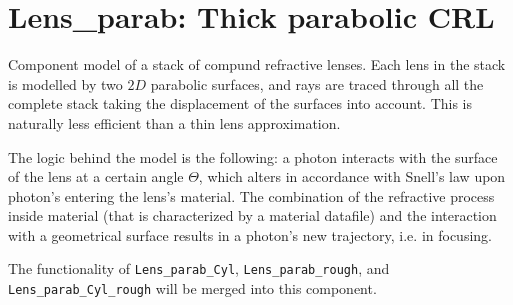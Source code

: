 \section{Lens\_parab: Thick parabolic CRL}
\label{s:lens-parab}

Component model of a stack of compund refractive lenses. Each lens in the stack
is modelled by two $2D$ parabolic surfaces, and rays are traced through all the
complete stack taking the displacement of the surfaces into account. This is
naturally less efficient than a thin lens approximation.

The logic behind the model is the following: a photon interacts with the
surface of the lens at a certain angle $\Theta$, which alters in accordance
with Snell's law upon photon's entering the lens's material. The combination of
the refractive process inside material (that is characterized by a material
datafile) and the interaction with a geometrical surface results in a photon's
new trajectory, i.e. in focusing.

The functionality of \texttt{Lens\_parab\_Cyl}, \texttt{Lens\_parab\_rough},
and \texttt{Lens\_parab\_Cyl\_rough} will be merged into this component.
